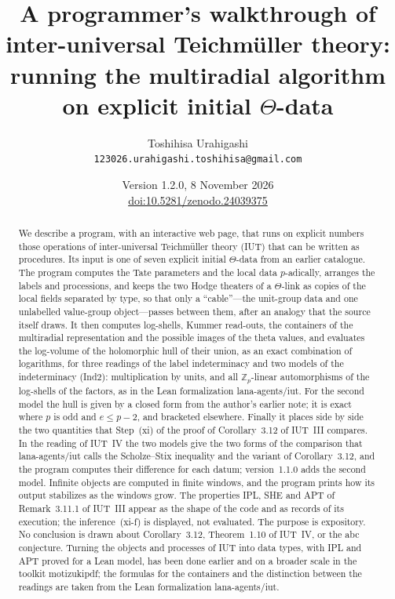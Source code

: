 \documentclass[11pt,a4paper]{article}
\title{A programmer's walkthrough of\\ inter-universal Teichm\"uller theory:\\
running the multiradial algorithm\\ on explicit initial $\Theta$-data}
\author{Toshihisa Urahigashi\\\small\texttt{123026.urahigashi.toshihisa@gmail.com}}
\date{Version 1.2.0, 8 November 2026\\\small\href{https://doi.org/10.5281/zenodo.24039375}{doi:10.5281/zenodo.24039375}}
\newcommand{\Z}{\mathbb{Z}}
\begin{document}
\maketitle

\begin{abstract}
We describe a program, with an interactive web page, that runs on explicit numbers those operations of
inter-universal Teichm\"uller theory (IUT) that can be written as procedures. Its input is one of seven explicit
initial $\Theta$-data from an earlier catalogue. The program computes the Tate parameters and the local data
$p$-adically, arranges the labels and processions, and keeps the two Hodge theaters of a $\Theta$-link as
copies of the local fields separated by type, so that only a ``cable''---the unit-group data and one unlabelled
value-group object---passes between them, after an analogy that the source itself draws. It then computes
log-shells, Kummer read-outs, the containers of the multiradial representation and the possible images of the
theta values, and evaluates the log-volume of the holomorphic hull of their union, as an exact combination of
logarithms, for three readings of the label indeterminacy and two models of the indeterminacy (Ind2):
multiplication by units, and all $\Z_p$-linear automorphisms of the log-shells of the factors, as in the Lean
formalization lana-agents/iut. For the second model the hull is given by a closed form from the author's earlier
note; it is exact where $p$ is odd and $e\le p-2$, and bracketed elsewhere. Finally it places side by
side the two quantities that Step~(xi) of the proof of Corollary~3.12 of IUT~III compares. In the reading of
IUT~IV the two models give the two forms of the comparison that lana-agents/iut calls the Scholze--Stix inequality
and the variant of Corollary~3.12, and the program computes their difference for each datum; version~1.1.0 adds the
second model. Infinite objects are
computed in finite windows, and the program prints how its output stabilizes as the windows grow. The
properties IPL, SHE and APT of Remark~3.11.1 of IUT~III appear as the shape of the code and as records of its
execution; the inference~(xi-f) is displayed, not evaluated. The purpose is expository. No conclusion is drawn
about Corollary~3.12, Theorem~1.10 of IUT~IV, or the abc conjecture. Turning the objects and processes of IUT
into data types, with IPL and APT proved for a Lean model, has been done earlier and on a broader scale in the
toolkit motizukipdf; the formulas for the containers and the distinction between the readings are taken from the
Lean formalization lana-agents/iut.
\end{abstract}
\end{document}
